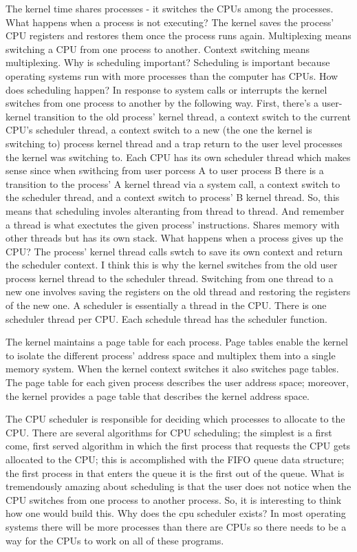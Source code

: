 \documentclass{amsbook}
\begin{document}
The kernel time shares processes - it switches the CPUs among the processes. What happens when a process is not executing? The kernel saves the process' CPU registers and restores them once the process runs again. Multiplexing means switching a CPU from one process to another. Context switching means multiplexing. Why is scheduling important? Scheduling is important because operating systems run with more processes than the computer has CPUs. How does scheduling happen? In response to system calls or interrupts the kernel switches from one process to another by the following way. First, there's a user-kernel transition to the old process' kernel thread, a context switch to the current CPU's scheduler thread, a context switch to a new (the one the kernel is switching to) process kernel thread and a trap return to the user level processes the kernel was switching to. Each CPU has its own scheduler thread which makes sense since when swithcing from user porcess A to user process B there is a transition to the process' A kernel thread via a system call, a context switch to the scheduler thread, and a context switch to process' B kernel thread. So, this means that scheduling involes alteranting from thread to thread. And remember a thread is what exectutes the given process' instructions. Shares memory with other threads but has its own stack. What happens when a process gives up the CPU? The process' kernel thread calls swtch to save its own context and return the scheduler context. I think this is why the kernel switches from the old user process kernel thread to the scheduler thread. Switching from one thread to a new one involves saving the registers on the old thread and restoring the registers of the new one. A scheduler is essentially a thread in the CPU. There is one scheduler thread per CPU. Each schedule thread has the scheduler function.

The kernel maintains a page table for each process. Page tables enable the kernel to isolate the different process' address space and multiplex them into a single memory system. When the kernel context switches it also switches page tables. The page table for each given process describes the user address space; moreover, the kernel provides a page table that describes the kernel address space.


The CPU scheduler is responsible for deciding which processes to allocate to the CPU. There are several algorithms for CPU scheduling; the simplest is a first come, first served algorithm in which the first process that requests the CPU gets allocated to the CPU; this is accomplished with the FIFO queue data structure; the first process in that enters the queue it is the first out of the queue. What is tremendously amazing about scheduling is that the user does not notice when the CPU switches from one process to another process. So, it is interesting to think how one would build this. Why does the cpu scheduler exists? In most operating systems there will be more processes than there are CPUs so there needs to be a way for the CPUs to work on all of these programs. 
\end{document}
